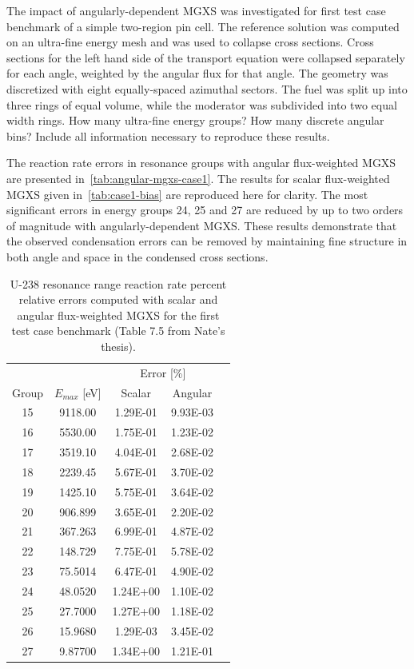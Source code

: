 The impact of angularly-dependent MGXS was investigated for first test case benchmark of a simple two-region pin cell. The reference solution was computed on an ultra-fine energy mesh and was used to collapse cross sections. Cross sections for the left hand side of the transport equation were collapsed separately for each angle, weighted by the angular flux for that angle. The geometry was discretized with eight equally-spaced azimuthal sectors. The fuel was split up into three rings of equal volume, while the moderator was subdivided into two equal width rings. {\color{red} How many ultra-fine energy groups? How many discrete angular bins? Include all information necessary to reproduce these results.}

The reaction rate errors in resonance groups with angular flux-weighted MGXS are presented in~\autoref{tab:angular-mgxs-case1}. The results for scalar flux-weighted MGXS given in~\autoref{tab:case1-bias} are reproduced here for clarity. The most significant errors in energy groups 24, 25 and 27 are reduced by up to two orders of magnitude with angularly-dependent MGXS. These results demonstrate that the observed condensation errors can be removed by maintaining fine structure in both angle and space in the condensed cross sections.

\begin{table}[h!]
  \centering
  \caption{U-238 resonance range reaction rate percent relative errors computed with scalar and angular flux-weighted MGXS for the first test case benchmark {(\color{red}Table 7.5 from Nate's thesis)}.}
  \label{tab:angular-mgxs-case1}
  \begin{tabular}{c c c c c}
  \toprule
  & & \multicolumn{2}{c}{Error [\%]} \\
  \cline{3-4}
  Group & $E_{max}$ [eV] & Scalar & Angular \\
  \midrule
  15 & 9118.00 & 1.29E-01 & 9.93E-03 \\
  16 & 5530.00 & 1.75E-01 & 1.23E-02 \\
  17 & 3519.10 & 4.04E-01 & 2.68E-02 \\
  18 & 2239.45 & 5.67E-01 & 3.70E-02 \\
  19 & 1425.10 & 5.75E-01 & 3.64E-02 \\
  20 & 906.899 & 3.65E-01 & 2.20E-02 \\
  21 & 367.263 & 6.99E-01 & 4.87E-02 \\
  22 & 148.729 & 7.75E-01 & 5.78E-02 \\
  23 & 75.5014 & 6.47E-01 & 4.90E-02 \\
  24 & 48.0520 & 1.24E+00 & 1.10E-02 \\
  25 & 27.7000 & 1.27E+00 & 1.18E-02 \\
  26 & 15.9680 & 1.29E-03 & 3.45E-02 \\
  27 & 9.87700 & 1.34E+00 & 1.21E-01 \\
  \bottomrule
\end{tabular}
\end{table}

